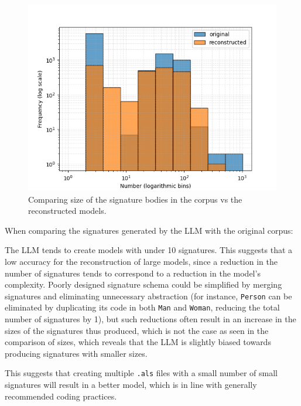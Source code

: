 \documentclass[conference]{IEEEtran}
\begin{document}
    
    \begin{figure}[htbp]
    \centerline{\includegraphics[width=\linewidth]{"./Comparing size of the signature bodies in the corpus vs the reconstructed models.png"}}
    \caption{Comparing size of the signature bodies in the corpus vs the reconstructed models.}
    \label{fig}
    \end{figure}

    When comparing the signatures generated by the LLM with the original corpus:

    The LLM tends to create models with under 10 signatures. This suggests that a low accuracy for the reconstruction of large models, since a reduction in the number of signatures tends to correspond to a reduction in the model's complexity. Poorly designed signature schema could be simplified by merging signatures and eliminating unnecessary abstraction (for instance, \verb|Person| can be eliminated by duplicating its code in both \verb|Man| and \verb|Woman|, reducing the total number of signatures by 1), but such reductions often result in an increase in the sizes of the signatures thus produced, which is not the case as seen in the comparison of sizes, which reveals that the LLM is slightly biased towards producing signatures with smaller sizes.
    
    This suggests that creating multiple \verb|.als| files with a small number of small signatures will result in a better model, which is in line with generally recommended coding practices.
\end{document}
